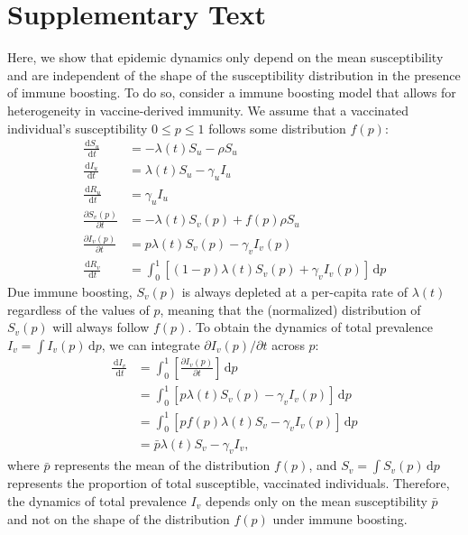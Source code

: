 \documentclass[12pt]{article}
\newcommand{\dd}[1]{\ensuremath{\, \mathrm{d}#1}}
\begin{document}
\pagebreak

\section*{Supplementary Text}

Here, we show that epidemic dynamics only depend on the mean susceptibility and are independent of the shape of the susceptibility distribution in the presence of immune boosting.
To do so, consider a immune boosting model that allows for heterogeneity in vaccine-derived immunity.
We assume that a vaccinated individual's susceptibility $0 \leq p \leq 1$ follows some distribution $f(p)$:
\begin{align}
\frac{\dd S_u}{\dd t} &= - \lambda(t) S_u - \rho S_u \\
\frac{\dd I_u}{\dd t} &= \lambda(t) S_u - \gamma_u I_u \\
\frac{\dd R_u}{\dd t} &= \gamma_u I_u \\
\frac{\partial S_v(p)}{\partial t} &= - \lambda(t) S_v(p) + f(p) \rho S_u  \\
\frac{\partial I_v(p)}{\partial t} &= p \lambda(t) S_v(p) - \gamma_v I_v(p) \\
\frac{\dd R_v}{\dd t} &= \int_0^1 \left[ (1-p) \lambda(t) S_v(p) + \gamma_v I_v(p) \right]\dd p
\end{align}
Due immune boosting, $S_v(p)$ is always depleted at a per-capita rate of $\lambda(t)$ regardless of the values of $p$, meaning that the (normalized) distribution of $S_v(p)$ will always follow $f(p)$.
To obtain the dynamics of total prevalence $I_v = \int I_v(p) \dd p$, we can integrate $\partial I_v(p)/\partial t$ across $p$:
\begin{align}
\frac{\dd I_v}{\dd t} &=  \int_0^1\left[\frac{\partial I_v(p)}{\partial t}\right]\dd p\\
&= \int_0^1\left[p \lambda(t) S_v(p) - \gamma_v I_v(p)\right]\dd p\\
&= \int_0^1\left[p f(p) \lambda(t) S_v - \gamma_v I_v(p)\right]\dd p\\
&= \bar{p} \lambda(t) S_v - \gamma_v I_v,
\end{align}
where $\bar{p}$ represents the mean of the distribution $f(p)$, and $S_v = \int S_v(p) \dd p$ represents the proportion of total susceptible, vaccinated individuals.
Therefore, the dynamics of total prevalence $I_v$ depends only on the mean susceptibility $\bar{p}$ and not on the shape of the distribution $f(p)$ under immune boosting.

\pagebreak


\end{document}
